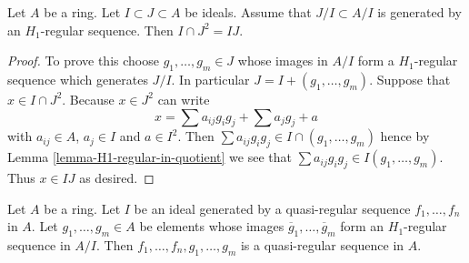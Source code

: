 \begin{lemma}
\label{lemma-conormal-sequence-H1-regular}
Let $A$ be a ring. Let $I \subset J \subset A$ be ideals.
Assume that $J/I \subset A/I$ is generated by an $H_1$-regular sequence.
Then $I \cap J^2 = IJ$.
\end{lemma}

\begin{proof}
To prove this choose $g_1, \ldots, g_m \in J$
whose images in $A/I$ form a $H_1$-regular sequence which generates $J/I$.
In particular $J = I + (g_1, \ldots, g_m)$.
Suppose that $x \in I \cap J^2$. Because $x \in J^2$ can write
$$
x =
\sum a_{ij} g_ig_j +
\sum a_j g_j +
a
$$
with $a_{ij} \in A$, $a_j \in I$ and $a \in I^2$.
Then $\sum a_{ij}g_ig_j \in I \cap (g_1, \ldots, g_m)$
hence by
Lemma \ref{lemma-H1-regular-in-quotient}
we see that $\sum a_{ij}g_ig_j \in I(g_1, \ldots, g_m)$.
Thus $x \in IJ$ as desired.
\end{proof}

\begin{lemma}
\label{lemma-join-quasi-regular-H1-regular}
Let $A$ be a ring. Let $I$ be an ideal generated by a quasi-regular
sequence $f_1, \ldots, f_n$ in $A$. Let $g_1, \ldots, g_m \in A$ be
elements whose images $\overline{g}_1, \ldots, \overline{g}_m$ form an
$H_1$-regular sequence in $A/I$. Then $f_1, \ldots, f_n, g_1, \ldots, g_m$
is a quasi-regular sequence in $A$.
\end{lemma}

